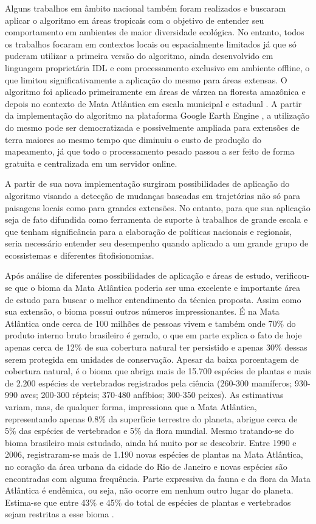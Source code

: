 Alguns trabalhos em âmbito nacional também foram realizados e buscaram aplicar o algoritmo em áreas tropicais com o objetivo de entender seu comportamento em ambientes de maior diversidade ecológica. No entanto, todos os trabalhos focaram em contextos locais ou espacialmente limitados já que só puderam utilizar a primeira versão do algoritmo, ainda desenvolvido em linguagem proprietária IDL e com processamento exclusivo em ambiente offline, o que limitou significativamente a aplicação do mesmo para áreas extensas. O algoritmo foi aplicado primeiramente em áreas de várzea na floresta amazônica \citep{FRAGAL2016} e depois no contexto de Mata Atlântica em escala municipal \citep{Zebende2020} e estadual \citep{Weckmuller2019}. A partir da implementação do algoritmo na plataforma Google Earth Engine \citep{Kennedy2018}, a utilização do mesmo pode ser democratizada e possivelmente ampliada para extensões de terra maiores ao mesmo tempo que diminuiu o custo de produção do mapeamento, já que todo o processamento pesado passou a ser feito de forma gratuita e centralizada em um servidor online.

A partir de sua nova implementação surgiram possibilidades de aplicação do algoritmo visando a detecção de mudanças baseadas em trajetórias não só para paisagens locais como para grandes extensões. No entanto, para que sua aplicação seja de fato difundida como ferramenta de suporte à trabalhos de grande escala e que tenham significância para a elaboração de políticas nacionais e regionais, seria necessário entender seu desempenho quando aplicado a um grande grupo de ecossistemas e diferentes fitofisionomias.

Após análise de diferentes possibilidades de aplicação e áreas de estudo, verificou-se que o bioma da Mata Atlântica poderia ser uma excelente e importante área de estudo para buscar o melhor entendimento da técnica proposta. Assim como sua extensão, o bioma possui outros números impressionantes. É na Mata Atlântica onde cerca de 100 milhões de pessoas vivem e também onde 70\% do produto interno bruto brasileiro é gerado, o que em parte explica o fato de hoje apenas cerca de 12\% de sua cobertura natural ter persistido e apenas 30\% dessas serem protegida em unidades de conservação. Apesar da baixa porcentagem de cobertura natural, é o bioma que abriga mais de 15.700 espécies de plantas e mais de 2.200 espécies de vertebrados registrados pela ciência (260-300 mamíferos; 930-990 aves; 200-300 répteis; 370-480 anfíbios; 300-350 peixes). As estimativas variam, mas, de qualquer forma, impressiona que a Mata Atlântica, representando apenas 0.8\% da superfície terrestre do planeta, abrigue cerca de 5\% das espécies de vertebrados e 5\% da flora mundial. Mesmo tratando-se do bioma brasileiro mais estudado, ainda há muito por se descobrir. Entre 1990 e 2006, registraram-se mais de 1.190 novas espécies de plantas na Mata Atlântica, no coração da área urbana da cidade do Rio de Janeiro e novas espécies são encontradas com alguma frequência. Parte expressiva da fauna e da flora da Mata Atlântica é endêmica, ou seja, não ocorre em nenhum outro lugar do planeta. Estima-se que entre 43\% e 45\% do total de espécies de plantas e vertebrados sejam restritas a esse bioma \citep{scarano2014}.

